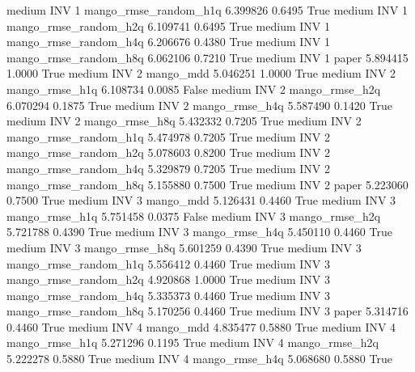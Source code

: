     medium      INV                 1 mango_rmse_random_h1q   6.399826      0.6495    True
    medium      INV                 1 mango_rmse_random_h2q   6.109741      0.6495    True
    medium      INV                 1 mango_rmse_random_h4q   6.206676      0.4380    True
    medium      INV                 1 mango_rmse_random_h8q   6.062106      0.7210    True
    medium      INV                 1                 paper   5.894415      1.0000    True
    medium      INV                 2             mango_mdd   5.046251      1.0000    True
    medium      INV                 2        mango_rmse_h1q   6.108734      0.0085   False
    medium      INV                 2        mango_rmse_h2q   6.070294      0.1875    True
    medium      INV                 2        mango_rmse_h4q   5.587490      0.1420    True
    medium      INV                 2        mango_rmse_h8q   5.432332      0.7205    True
    medium      INV                 2 mango_rmse_random_h1q   5.474978      0.7205    True
    medium      INV                 2 mango_rmse_random_h2q   5.078603      0.8200    True
    medium      INV                 2 mango_rmse_random_h4q   5.329879      0.7205    True
    medium      INV                 2 mango_rmse_random_h8q   5.155880      0.7500    True
    medium      INV                 2                 paper   5.223060      0.7500    True
    medium      INV                 3             mango_mdd   5.126431      0.4460    True
    medium      INV                 3        mango_rmse_h1q   5.751458      0.0375   False
    medium      INV                 3        mango_rmse_h2q   5.721788      0.4390    True
    medium      INV                 3        mango_rmse_h4q   5.450110      0.4460    True
    medium      INV                 3        mango_rmse_h8q   5.601259      0.4390    True
    medium      INV                 3 mango_rmse_random_h1q   5.556412      0.4460    True
    medium      INV                 3 mango_rmse_random_h2q   4.920868      1.0000    True
    medium      INV                 3 mango_rmse_random_h4q   5.335373      0.4460    True
    medium      INV                 3 mango_rmse_random_h8q   5.170256      0.4460    True
    medium      INV                 3                 paper   5.314716      0.4460    True
    medium      INV                 4             mango_mdd   4.835477      0.5880    True
    medium      INV                 4        mango_rmse_h1q   5.271296      0.1195    True
    medium      INV                 4        mango_rmse_h2q   5.222278      0.5880    True
    medium      INV                 4        mango_rmse_h4q   5.068680      0.5880    True
